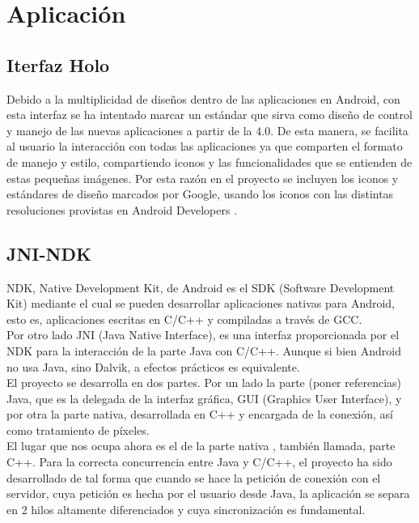 \section{Aplicación}

\subsection{Iterfaz Holo}

Debido a la multiplicidad de diseños dentro de las aplicaciones en Android, con esta interfaz se ha intentado marcar un estándar que sirva como diseño de control y manejo de las nuevas aplicaciones a partir de la 4.0. De esta manera, se facilita al usuario la interacción con todas las aplicaciones ya que comparten el formato de manejo y estilo, compartiendo iconos y las funcionalidades que se entienden de estas pequeñas imágenes. Por esta razón en el proyecto se incluyen los iconos y estándares de diseño marcados por Google, usando los iconos con las distintas resoluciones provistas en Android Developers \cite{holo:holo}.

\subsection{JNI-NDK}
NDK, Native Development Kit, de Android es el SDK (Software Development Kit) mediante el cual se pueden desarrollar aplicaciones nativas para Android, esto es, aplicaciones escritas en C/C++ y compiladas a través de GCC.\\

Por otro lado JNI (Java Native Interface), es una interfaz proporcionada por el NDK para la interacción de la parte Java con C/C++. Aunque si bien Android no usa Java, sino Dalvik, a efectos prácticos es equivalente.\\

El proyecto se desarrolla en dos partes. Por un lado la parte (poner referencias) Java, que es la delegada de la interfaz gráfica, GUI (Graphics User Interface), y por otra la parte nativa, desarrollada en C++ y encargada de la conexión, así como tratamiento de píxeles.\\

El lugar que nos ocupa ahora es el de la parte nativa , también llamada, parte C++. Para la correcta concurrencia entre Java y C/C++, el proyecto ha sido desarrollado de tal forma que cuando se hace la petición de conexión con el servidor, cuya petición es hecha por el usuario desde Java, la aplicación se separa en 2 hilos altamente diferenciados y cuya sincronización es fundamental.\\

